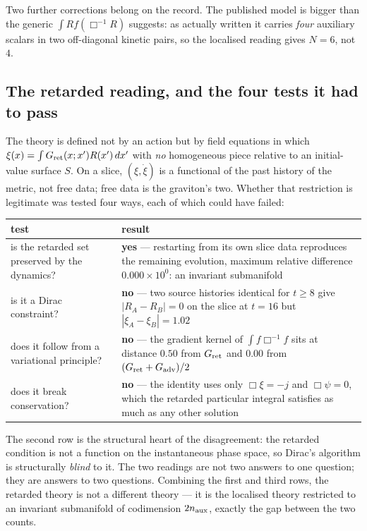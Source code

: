\documentclass[11pt,letterpaper]{article}
\newcommand{\dal}{\Box}
\begin{document}
Two further corrections belong on the record. The published model is bigger than the generic $\int Rf(\dal^{-1}R)$ suggests: as actually written \cite{TanWoodard2018} it carries \emph{four} auxiliary scalars in two off-diagonal kinetic pairs, so the localised reading gives $N=6$, not $4$.

\subsection{The retarded reading, and the four tests it had to pass}
The theory is defined not by an action but by field equations in which $\xi(x)=\int G_{\rm ret}(x;x')R(x')\,dx'$ with \emph{no} homogeneous piece relative to an initial-value surface $S$. On a slice, $(\xi,\dot\xi)$ is a functional of the past history of the metric, not free data; free data is the graviton's two. Whether that restriction is legitimate was tested four ways, each of which could have failed:
\begin{center}\small
\begin{tabular}{L{0.46\textwidth}L{0.46\textwidth}}\toprule
test & result\\\midrule
is the retarded set preserved by the dynamics? & \textbf{yes} --- restarting from its own slice data reproduces the remaining evolution, maximum relative difference $0.000\times10^{0}$: an invariant submanifold\\
is it a Dirac constraint? & \textbf{no} --- two source histories identical for $t\ge8$ give $|R_A-R_B|=0$ on the slice at $t=16$ but $|\xi_A-\xi_B|=1.02$\\
does it follow from a variational principle? & \textbf{no} --- the gradient kernel of $\int f\dal^{-1}f$ sits at distance $0.50$ from $G_{\rm ret}$ and $0.00$ from $(G_{\rm ret}+G_{\rm adv})/2$ \cite{Foffa2014}\\
does it break conservation? & \textbf{no} --- the identity uses only $\dal\xi=-j$ and $\dal\psi=0$, which the retarded particular integral satisfies as much as any other solution\\\bottomrule
\end{tabular}
\end{center}
The second row is the structural heart of the disagreement: the retarded condition is not a function on the instantaneous phase space, so Dirac's algorithm is structurally \emph{blind} to it. The two readings are not two answers to one question; they are answers to two questions. Combining the first and third rows, the retarded theory is not a different theory --- it is the localised theory restricted to an invariant submanifold of codimension $2n_{\rm aux}$, exactly the gap between the two counts.
\end{document}
